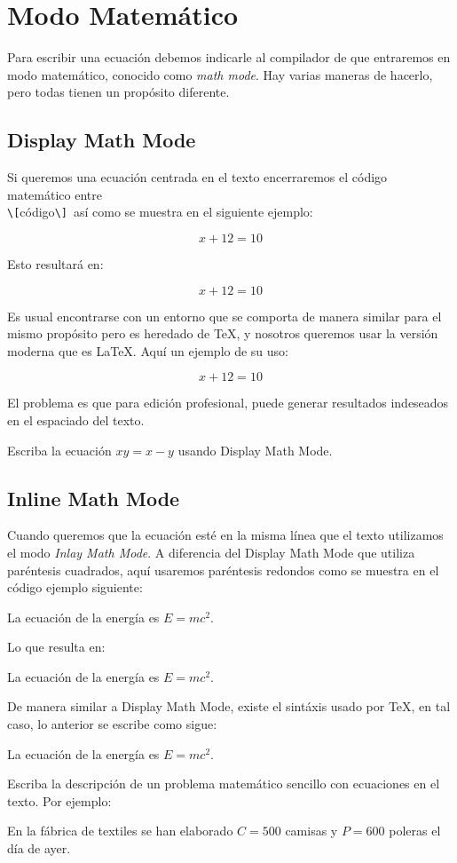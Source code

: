 \documentclass[graybox,envcountchap,sectrefs]{svmono}
\begin{document}
\section{Modo Matemático}
    Para escribir una ecuación debemos indicarle al compilador de que entraremos en modo matemático, conocido como 
    \emph{math mode}. Hay varias maneras de hacerlo, pero todas tienen un propósito diferente.
    \subsection{Display Math Mode}
    Si queremos una ecuación centrada en el texto encerraremos el código matemático entre \\
    \verb|\[|{\color{red}código}\verb|\]|~así como se muestra en el siguiente ejemplo:
        \begin{code}
            \[ x + 12 = 10 \]
        \end{code}
        Esto resultará en:
        \begin{compiled}
            \[x + 12 = 10\]
        \end{compiled}
    Es usual encontrarse con un entorno que se comporta de manera similar para el mismo propósito
    pero es heredado de \TeX, y nosotros queremos usar la versión moderna que es \LaTeX. Aquí un ejemplo de su uso:
        \begin{code}
            $$ x + 12 = 10 $$
        \end{code}
    El problema es que para edición profesional, puede generar resultados indeseados en el espaciado del texto.
    \begin{exercise}
        Escriba la ecuación \(xy = x - y\) usando Display Math Mode.
    \end{exercise}

    \subsection{Inline Math Mode}
    Cuando queremos que la ecuación esté en la misma línea que el texto utilizamos el modo \emph{Inlay Math Mode}.
    A diferencia del Display Math Mode que utiliza paréntesis cuadrados, aquí usaremos paréntesis redondos como se muestra en el código ejemplo siguiente:
    \begin{code}
        La ecuación de la energía es \(E=mc^2\).
    \end{code}
    Lo que resulta en: 

    \begin{compiled}
    La ecuación de la energía es \(E=mc^2\).
    \end{compiled}
    De manera similar a Display Math Mode, existe el sintáxis usado por \TeX, en tal caso, lo anterior se escribe como sigue:
    \begin{code}
        La ecuación de la energía es $E=mc^2$.
    \end{code}
    \begin{exercise}
        Escriba la descripción de un problema matemático sencillo con ecuaciones en el texto. Por ejemplo:

        En la fábrica de textiles se han elaborado \(C=500\) camisas y \(P=600\) poleras el día de ayer.
    \end{exercise}
\end{document}
